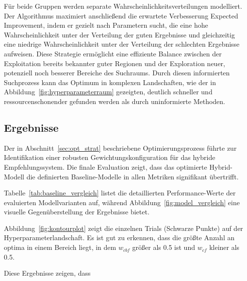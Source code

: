 Für beide Gruppen werden separate Wahrscheinlichkeitsverteilungen modelliert. Der Algorithmus maximiert 
anschließend die erwartete Verbesserung Expected Improvement, indem er gezielt nach Parametern sucht, 
die eine hohe Wahrscheinlichkeit unter der Verteilung der guten Ergebnisse und gleichzeitig eine 
niedrige Wahrscheinlichkeit unter der Verteilung der schlechten Ergebnisse aufweisen. Diese Strategie 
ermöglicht eine effiziente Balance zwischen der Exploitation bereits bekannter guter 
Regionen und der Exploration neuer, potenziell noch besserer Bereiche des Suchraums. 
Durch diesen informierten Suchprozess kann das Optimum in komplexen Landschaften, wie der in 
Abbildung~\ref{fig:hyperparameterraum} gezeigten, deutlich schneller und ressourcenschonender 
gefunden werden als durch uninformierte Methoden.

\subsection{Ergebnisse}
\label{sec:results}
Der in Abschnitt~\ref{sec:opt_strat} beschriebene Optimierungsprozess führte zur Identifikation 
einer robusten Gewichtungskonfiguration für das hybride Empfehlungssystem. Die finale 
Evaluation zeigt, dass das optimierte Hybrid-Modell die definierten Baseline-Modelle 
in allen Metriken signifikant übertrifft.

Tabelle~\ref{tab:baseline_vergleich} listet die detaillierten Performance-Werte der evaluierten 
Modellvarianten auf, während Abbildung~\ref{fig:model_vergleich} eine visuelle 
Gegenüberstellung der Ergebnisse bietet.





Abbildung~\ref{fig:kontourplot} zeigt die einzelnen Trials (Schwarze Punkte) auf der Hyperparameterlandschaft. 
Es ist gut zu erkennen, dass die größte Anzahl an optima in einem Bereich liegt, in dem $w_{cbf}$ größer als 0.5 ist und
$w_{cf}$ kleiner als 0.5.

Diese Ergebnisse zeigen, dass


% 
